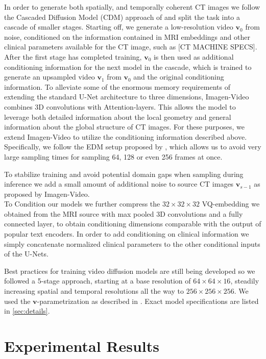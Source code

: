 \documentclass{article}
\begin{document}
In order to generate both spatially, and temporally coherent CT images we follow the Cascaded Diffusion Model (CDM) approach of \cite{ho2022imagen} and split the task into a cascade of smaller stages. Starting off, we generate a low-resolution video $\boldsymbol{v}_0$ from noise, conditioned on the information contained in MRI embeddings and other clinical parameters available for the CT image, such as [CT MACHINE SPECS]. After the first stage has completed training, $\boldsymbol{v}_0$ is then used as additional conditioning information for the next model in the cascade, which is trained to generate an upsampled video $\boldsymbol{v}_1$ from $\boldsymbol{v}_0$ and the original conditioning information. To alleviate some of the enormous memory requirements of extending the standard U-Net architecture to three dimensions, Imagen-Video \cite{ho2022imagen} combines 3D convolutions with Attention-layers. This allows the model to leverage both detailed information about the local geometry and general information about the global structure of CT images. For these purposes, we extend Imagen-Video to utilize the conditioning information described above. Specifically, we follow the EDM setup proposed by \cite{karras2022elucidating}, which allows us to avoid very large sampling times for sampling 64, 128 or even 256 frames at once.

To stabilize training and avoid potential domain gaps when sampling during inference we add a small amount of additional noise to source CT images $\boldsymbol{v}_{s-1}$ as proposed by Imagen-Video.\\
To Condition our models we further compress the $32\times32\times32$ VQ-embedding we obtained from the MRI source with max pooled 3D convolutions and a fully connected layer, to obtain conditioning dimensions comparable with the output of popular text encoders. In order to add conditioning on clinical information we simply concatenate normalized clinical parameters to the other conditional inputs of the U-Nets.

Best practices for training video diffusion models are still being developed so we followed a 5-stage approach, starting at a base resolution of  $64\times64\times16$, steadily increasing spatial and temporal resolutions all the way to  $256\times256\times256$. We used the $\boldsymbol{v}$-parametrization as described in \cite{song2022denoising}. Exact model specifications are listed in \ref{sec:details}.



\section{Experimental Results}
\end{document}
